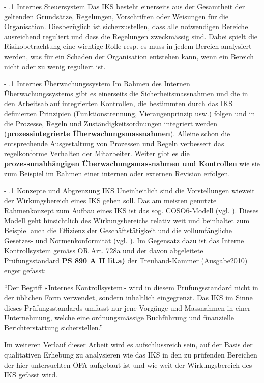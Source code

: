 \documentclass[10pt]{article}
\makeatletter
\renewcommand\subparagraph{\@startsection{subparagraph}{4}{0mm}{-\baselineskip}{.1\baselineskip}{\normalfont\normalsize\bfseries}}
\renewcommand\subparagraph{%
\@startsection{subparagraph}{4}{0mm}%
{-\baselineskip}%
{.1\baselineskip}%
{\normalfont\normalsize\bfseries}}
\makeatother
\begin{document}
\subparagraph{Internes Steuersystem}\label{subpara:internes_steuersystem}
Das IKS besteht einerseits aus der Gesamtheit der geltenden Grundsätze, Regelungen, Vorschriften oder Weisungen für die Organisation. Diesbezüglich ist sicherzustellen, dass alle notwendigen Bereiche ausreichend reguliert und dass die Regelungen zweckmässig sind. Dabei spielt die Risikobetrachtung eine wichtige Rolle resp. es muss in jedem Bereich analysiert werden, was für ein Schaden der Organisation entstehen kann, wenn ein Bereich nicht oder zu wenig reguliert ist. 

\subparagraph{Internes Überwachungssystem}\label{subpara:internes_uberwachungssystem}
Im Rahmen des Internen Überwachungssystems gibt es einerseits die Sicherheitsmassnahmen und die in den Arbeitsablauf integrierten Kontrollen, die bestimmten durch das IKS definierten Prinzipien (Funktionstrennung, Vieraugenprinzip usw.) folgen und in die Prozesse, Regeln und Zuständigkeitsordnungen integriert werden (\textbf{prozessintegrierte Überwachungsmassnahmen}). Alleine schon die entsprechende Ausgestaltung von Prozessen und Regeln verbessert das regelkonforme Verhalten der Mitarbeiter. Weiter gibt es die \textbf{prozessunabhängigen Überwachungsmassnahmen und Kontrollen} wie sie zum Beispiel im Rahmen einer internen oder externen Revision erfolgen.

\subparagraph{Konzepte und Abgrenzung IKS}\label{subpara:konzepte_und_abgrenzung_iks}
Uneinheitlich sind die Vorstellungen wieweit der Wirkungsbereich eines IKS gehen soll. Das am meisten genutzte Rahmenkonzept zum Aufbau eines IKS ist das sog. COSO6-Modell (vgl. \cite[22]{Hunziker2012}). Dieses Modell geht hinsichtlich des Wirkungsbereichs relativ weit und beinhaltet zum Beispiel auch die Effizienz der Geschäftstätigkeit und die vollumfängliche Gesetzes- und Normenkonformität (vgl. \cite[71]{Hunziker2012}). Im Gegensatz dazu ist das Interne Kontrollsystem gemäss OR Art. 728a und der davon abgeleitete Prüfungsstandard \textbf{PS 890 A II lit.a)} der Treuhand-Kammer (Ausgabe\thinspace{}2010) enger gefasst:~

“{}Der Begriff «Internes Kontrollsystem» wird in diesem Prüfungsstandard nicht in der üblichen Form verwendet, sondern inhaltlich eingegrenzt. Das IKS im Sinne dieses Prüfungsstandards umfasst nur jene Vorgänge und Massnahmen in einer Unternehmung, welche eine ordnungsmässige Buchführung und finanzielle Berichterstattung sicherstellen.”{}~

Im weiteren Verlauf dieser Arbeit wird es aufschlussreich sein, auf der Basis der qualitativen Erhebung zu analysieren wie das IKS in den zu prüfenden Bereichen der hier untersuchten ÖFA aufgebaut ist und wie weit der Wirkungsbereich des IKS gefasst wird.
\end{document}
